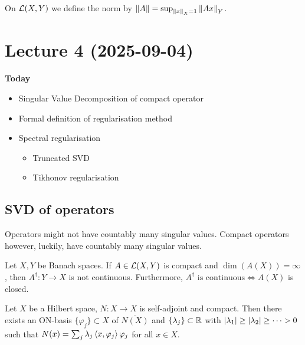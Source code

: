 \documentclass[12pt]{article}
\begin{document}
\begin{definition}
    On $\mathcal{L}(X,Y)$ we define the norm by $\left\lVert A\right\rVert = \sup_{\left\lVert x\right\rVert_X=1}\left\lVert Ax\right\rVert_Y$.
\end{definition}

\newpage
\section{Lecture 4 (2025-09-04)}

\textbf{Today}
\begin{itemize}
    \item Singular Value Decomposition of compact operator
    \item Formal definition of regularisation method
    \item Spectral regularisation
    \begin{itemize}
        \item Truncated SVD
        \item Tikhonov regularisation
    \end{itemize}
\end{itemize}

\subsection{SVD of operators}
Operators might not have countably many singular values. Compact operators however, luckily, have countably many singular values.

\begin{theorem}
    Let $X,Y$ be Banach spaces. If $A\in\mathcal{L}(X,Y)$ is compact and $\dim(A(X)) =\infty$, then $A^\dagger :Y\to X$ is not continuous. Furthermore, $A^\dagger \text{ is continuous}\Longleftrightarrow A(X)$ is closed. 
\end{theorem}

\begin{theorem}
    Let $X$ be a Hilbert space, $N:X\to X$ is self-adjoint and compact. Then there exists an ON-basis $\{\varphi_j\}\subset X$ of $\overline{N(X)}$ and $\{\lambda_j\}\subset \mathbb{R}$ with $\left|\lambda_1\right|\geq \left|\lambda_2\right| \geq \dots > 0$ such that $N(x) = \sum_j \lambda_j \left\langle x, \varphi_j\right\rangle\varphi_j$ for all $x\in X$.
\end{theorem}
\end{document}
